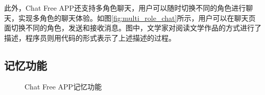 \documentclass{article}
\begin{document}
此外，Chat Free APP还支持多角色聊天，用户可以随时切换不同的角色进行聊天，实现多角色的聊天体验。如图\ref{fig:multi_role_chat}所示，用户可以在聊天页面切换不同的角色，发送和接收消息。图中，文学家对阅读文学作品的方式进行了描述，程序员则用代码的形式表示了上述描述的过程。

\newpage
\subsection{记忆功能}

\begin{figure}[h]
    \centering
    \caption{Chat Free APP记忆功能}
    \label{fig:memory}
\end{figure}
\end{document}
